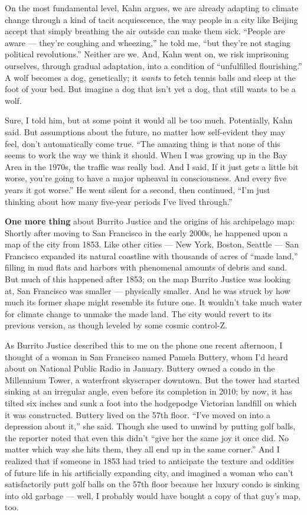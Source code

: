 On the most fundamental level, Kahn argues, we are already adapting to
climate change through a kind of tacit acquiescence, the way people in a
city like Beijing accept that simply breathing the air outside can make
them sick. ``People are aware --- they're coughing and wheezing,'' he
told me, ``but they're not staging political revolutions.'' Neither are
we. And, Kahn went on, we risk imprisoning ourselves, through gradual
adaptation, into a condition of ``unfulfilled flourishing.'' A wolf
becomes a dog, genetically; it \emph{wants} to fetch tennis balls and
sleep at the foot of your bed. But imagine a dog that isn't yet a dog,
that still wants to be a wolf.

Sure, I told him, but at some point it would all be too much.
Potentially, Kahn said. But assumptions about the future, no matter how
self-evident they may feel, don't automatically come true. ``The amazing
thing is that none of this seems to work the way we think it should.
When I was growing up in the Bay Area in the 1970s, the traffic was
really bad. And I said, If it just gets a little bit worse, you're going
to have a major upheaval in consciousness. And every five years it got
worse.'' He went silent for a second, then continued, ``I'm just
thinking about how many five-year periods I've lived through.''

\textbf{One more thing} about Burrito Justice and the origins of his
archipelago map: Shortly after moving to San Francisco in the early
2000s, he happened upon a map of the city from 1853. Like other cities
--- New York, Boston, Seattle --- San Francisco expanded its natural
coastline with thousands of acres of ``made land,'' filling in mud flats
and harbors with phenomenal amounts of debris and sand. But much of this
happened after 1853; on the map Burrito Justice was looking at, San
Francisco was smaller --- physically smaller. And he was struck by how
much its former shape might resemble its future one. It wouldn't take
much water for climate change to unmake the made land. The city would
revert to its previous version, as though leveled by some cosmic
control-Z.

As Burrito Justice described this to me on the phone one recent
afternoon, I thought of a woman in San Francisco named Pamela Buttery,
whom I'd heard about on National Public Radio in January. Buttery owned
a condo in the Millennium Tower, a waterfront skyscraper downtown. But
the tower had started sinking at an irregular angle, even before its
completion in 2010; by now, it has tilted six inches and sunk a foot
into the hodgepodge Victorian landfill on which it was constructed.
Buttery lived on the 57th floor. ``I've moved on into a depression about
it,'' she said. Though she used to unwind by putting golf balls, the
reporter noted that even this didn't ``give her the same joy it once
did. No matter which way she hits them, they all end up in the same
corner.'' And I realized that if someone in 1853 had tried to anticipate
the texture and oddities of future life in his artificially expanding
city, and imagined a woman who can't satisfactorily putt golf balls on
the 57th floor because her luxury condo is sinking into old garbage ---
well, I probably would have bought a copy of that guy's map, too.

